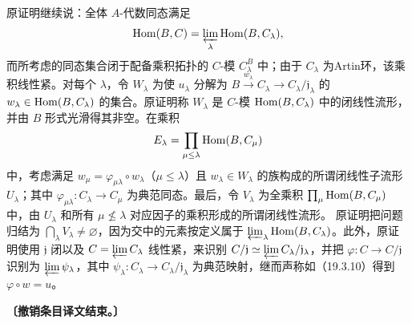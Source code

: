 原证明继续说：全体 $A$-代数同态满足
\[
 \operatorname{Hom}(B,C)=\varprojlim_\lambda\operatorname{Hom}(B,C_\lambda),
\]
而所考虑的同态集合闭于配备乘积拓扑的 $C$-模 $C_\lambda^B$ 中；由于 $C_\lambda$ 为Artin环，该乘积线性紧。对每个 $\lambda$，令 $W_\lambda$ 为使 $u_\lambda$ 分解为 $B\xrightarrow{w_\lambda}C_\lambda\to C_\lambda/\mathfrak j_\lambda$ 的 $w_\lambda\in\operatorname{Hom}(B,C_\lambda)$ 的集合。原证明称 $W_\lambda$ 是 $C$-模 $\operatorname{Hom}(B,C_\lambda)$ 中的闭线性流形，并由 $B$ 形式光滑得其非空。在乘积
\[
 E_\lambda=\prod_{\mu\leq\lambda}\operatorname{Hom}(B,C_\mu)
\]
中，考虑满足 $w_\mu=\varphi_{\mu\lambda}\circ w_\lambda$（$\mu\leq\lambda$）且 $w_\lambda\in W_\lambda$ 的族构成的所谓闭线性子流形 $U_\lambda$；其中 $\varphi_{\mu\lambda}:C_\lambda\to C_\mu$ 为典范同态。最后，令 $V_\lambda$ 为全乘积 $\prod_\mu\operatorname{Hom}(B,C_\mu)$ 中，由 $U_\lambda$ 和所有 $\mu\nleq\lambda$ 对应因子的乘积形成的所谓闭线性流形。
原证明把问题归结为 $\bigcap_\lambda V_\lambda\ne\varnothing$，因为交中的元素按定义属于 $\varprojlim_\lambda\operatorname{Hom}(B,C_\lambda)$。此外，原证明使用 $\mathfrak j$ 闭以及 $C=\varprojlim C_\lambda$ 线性紧，来识别 $C/\mathfrak j\simeq\varprojlim C_\lambda/\mathfrak j_\lambda$，并把 $\varphi:C\to C/\mathfrak j$ 识别为 $\varprojlim\psi_\lambda$，其中 $\psi_\lambda:C_\lambda\to C_\lambda/\mathfrak j_\lambda$ 为典范映射，继而声称如（19.3.10）得到 $\varphi\circ w=u$。\par
\noindent\textbf{〔撤销条目译文结束。〕}
